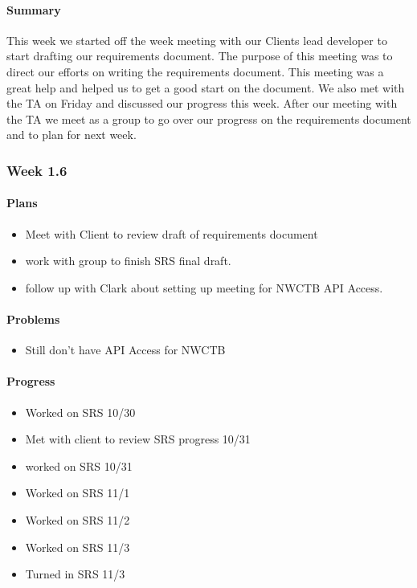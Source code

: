 \documentclass[onecolumn, draftclsnofoot,10pt, compsoc]{article}
\begin{document}
		    \paragraph{Summary}

		        This week we started off the week meeting with our Clients lead developer to start drafting our requirements document. The purpose of this meeting was to direct our efforts on writing the requirements document. This meeting was a great help and helped us to get a good start on the document.  We also met with the TA on Friday and discussed our progress this week. After our meeting with the TA we meet as a group to go over our progress on the requirements document and to plan for next week.\\

		\subsubsection{Week 1.6}

		    \paragraph{Plans} \hfill \break

		        \begin{itemize}
		            \item Meet with Client to review draft of requirements document
		            \item work with group to finish SRS final draft.
		            \item follow up with Clark about setting up meeting for NWCTB API Access.
		        \end{itemize}

		    \paragraph{Problems} \hfill \break

		        \begin{itemize}
		            \item Still don't have API Access for NWCTB
		        \end{itemize}

		    \paragraph{Progress} \hfill \break

		        \begin{itemize}
		            \item Worked on SRS 10/30
		            \item Met with client to review SRS progress 10/31
		            \item worked on SRS 10/31
		            \item Worked on SRS 11/1
		            \item Worked on SRS 11/2
		            \item Worked on SRS 11/3
		            \item Turned in SRS 11/3
		        \end{itemize}
\end{document}
